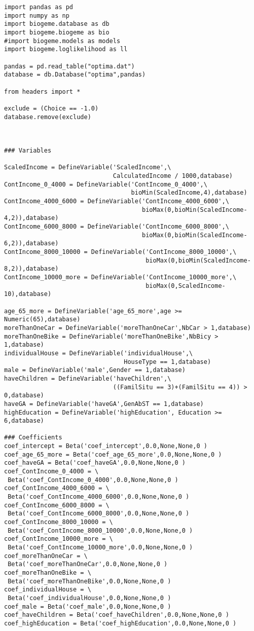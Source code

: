 \documentclass[12pt,a4paper]{article}
\begin{document}
\begin{lstlisting}[style=numbers]
import pandas as pd
import numpy as np
import biogeme.database as db
import biogeme.biogeme as bio
#import biogeme.models as models
import biogeme.loglikelihood as ll

pandas = pd.read_table("optima.dat")
database = db.Database("optima",pandas)

from headers import *

exclude = (Choice == -1.0)
database.remove(exclude)



### Variables

ScaledIncome = DefineVariable('ScaledIncome',\
                              CalculatedIncome / 1000,database)
ContIncome_0_4000 = DefineVariable('ContIncome_0_4000',\
                                   bioMin(ScaledIncome,4),database)
ContIncome_4000_6000 = DefineVariable('ContIncome_4000_6000',\
                                      bioMax(0,bioMin(ScaledIncome-4,2)),database)
ContIncome_6000_8000 = DefineVariable('ContIncome_6000_8000',\
                                      bioMax(0,bioMin(ScaledIncome-6,2)),database)
ContIncome_8000_10000 = DefineVariable('ContIncome_8000_10000',\
                                       bioMax(0,bioMin(ScaledIncome-8,2)),database)
ContIncome_10000_more = DefineVariable('ContIncome_10000_more',\
                                       bioMax(0,ScaledIncome-10),database)

age_65_more = DefineVariable('age_65_more',age >= Numeric(65),database)
moreThanOneCar = DefineVariable('moreThanOneCar',NbCar > 1,database)
moreThanOneBike = DefineVariable('moreThanOneBike',NbBicy > 1,database)
individualHouse = DefineVariable('individualHouse',\
                                 HouseType == 1,database)
male = DefineVariable('male',Gender == 1,database)
haveChildren = DefineVariable('haveChildren',\
                              ((FamilSitu == 3)+(FamilSitu == 4)) > 0,database)
haveGA = DefineVariable('haveGA',GenAbST == 1,database)
highEducation = DefineVariable('highEducation', Education >= 6,database)

### Coefficients
coef_intercept = Beta('coef_intercept',0.0,None,None,0 )
coef_age_65_more = Beta('coef_age_65_more',0.0,None,None,0 )
coef_haveGA = Beta('coef_haveGA',0.0,None,None,0 )
coef_ContIncome_0_4000 = \
 Beta('coef_ContIncome_0_4000',0.0,None,None,0 )
coef_ContIncome_4000_6000 = \
 Beta('coef_ContIncome_4000_6000',0.0,None,None,0 )
coef_ContIncome_6000_8000 = \
 Beta('coef_ContIncome_6000_8000',0.0,None,None,0 )
coef_ContIncome_8000_10000 = \
 Beta('coef_ContIncome_8000_10000',0.0,None,None,0 )
coef_ContIncome_10000_more = \
 Beta('coef_ContIncome_10000_more',0.0,None,None,0 )
coef_moreThanOneCar = \
 Beta('coef_moreThanOneCar',0.0,None,None,0 )
coef_moreThanOneBike = \
 Beta('coef_moreThanOneBike',0.0,None,None,0 )
coef_individualHouse = \
 Beta('coef_individualHouse',0.0,None,None,0 )
coef_male = Beta('coef_male',0.0,None,None,0 )
coef_haveChildren = Beta('coef_haveChildren',0.0,None,None,0 )
coef_highEducation = Beta('coef_highEducation',0.0,None,None,0 )


\end{lstlisting}
\end{document}
